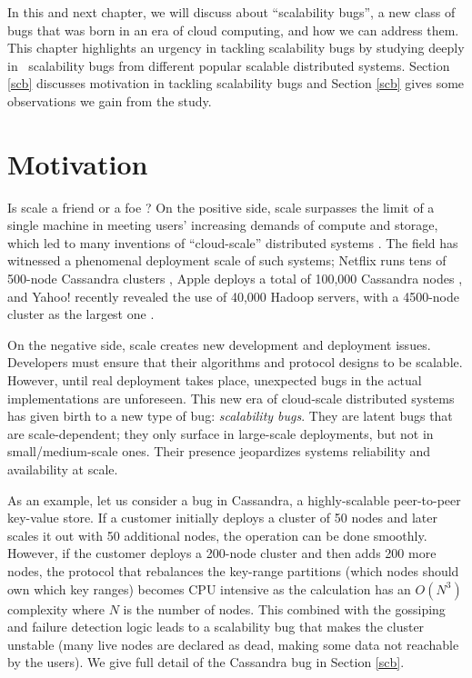 In this and next chapter, we will discuss about ``scalability bugs'', a new
class of bugs that was born in an era of cloud computing, and how we can address
them. This chapter highlights an urgency in tackling scalability bugs by
studying deeply in \totAll\ scalability bugs from different popular scalable
distributed systems. Section \ref{scb} discusses motivation in tackling
scalability bugs and Section \ref{scb} gives some observations we gain from the
study.

\section{Motivation}

Is scale a friend or a foe \cite{Ousterhout+11-ScaleFriendEnemy}?
On the positive side, scale surpasses the limit of a single machine in
meeting users' increasing demands of compute and storage, which led to
many inventions of ``cloud-scale'' distributed systems
\cite{Chang+06-BigTable, 
DeanGhemawat04-MapReduce, 
DeCandia+07-Dynamo,
Ghemawat+03-GoogleFS, 
Hindman+11-Mesos,
Verma+15-Borg}.  The field has witnessed a
phenomenal deployment scale of such systems;
%
Netflix runs tens of 500-node Cassandra clusters \cite{RunningNetflix13},
Apple deploys a total of 100,000 Cassandra nodes \cite{WikiCassandra}, 
and Yahoo! recently revealed the use of 40,000 Hadoop servers,
with a 4500-node cluster as the largest one \cite{LargestHadoop}.

On the negative side, scale creates new development and deployment issues.
Developers must ensure that their algorithms and protocol designs
to be scalable.
However, until real deployment takes place, unexpected bugs 
in the actual implementations are unforeseen.
This new era of cloud-scale distributed systems has given birth
to a new type of bug: {\em scalability bugs}.  They are latent bugs that
are scale-dependent; they only surface in large-scale deployments, but not
in small/medium-scale ones.  Their presence jeopardizes systems
reliability and availability at scale.

As an example, let us consider a bug in Cassandra, a
highly-scalable peer-to-peer key-value store.  If a customer initially
deploys a cluster of 50 nodes and later scales it out with 50 additional
nodes, the operation can be done smoothly.  However, if the customer
deploys a 200-node cluster and then adds 200 more nodes, the protocol that
rebalances the key-range partitions (which nodes should own which key
ranges) becomes CPU intensive as the calculation has an $O(N^3)$
complexity where $N$ is the number of nodes.  This combined with the
gossiping and failure detection logic leads to a scalability bug that
makes the cluster unstable (many live nodes are declared as dead, making
some data not reachable by the users). We give full detail of the Cassandra bug
in Section \ref{scb}.

